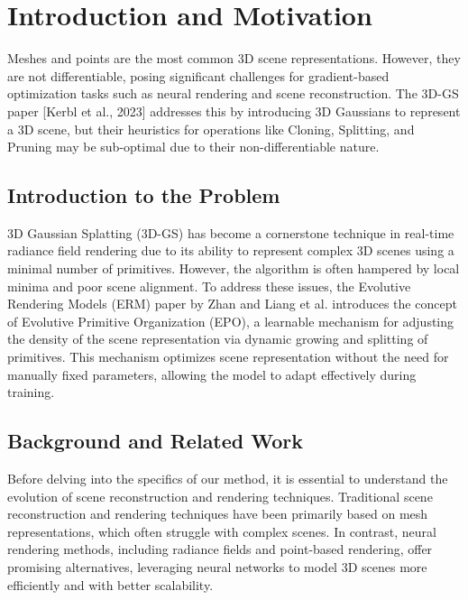 \documentclass[11pt]{report}
\title{\titleinfo}
\author{\authorinfo}
\date{}
\begin{document}
\maketitle
\thispagestyle{empty} %

\tableofcontents
\chapter{Introduction and Motivation}
Meshes and points are the most common 3D scene representations. However, they are not differentiable, posing significant challenges for gradient-based optimization tasks such as neural rendering and scene reconstruction. The 3D-GS paper [Kerbl et al., 2023] addresses this by introducing 3D Gaussians to represent a 3D scene, but their heuristics for operations like Cloning, Splitting, and Pruning may be sub-optimal due to their non-differentiable nature.

\section{Introduction to the Problem}
3D Gaussian Splatting (3D-GS) has become a cornerstone technique in real-time radiance field rendering due to its ability to represent complex 3D scenes using a minimal number of primitives. However, the algorithm is often hampered by local minima and poor scene alignment. To address these issues, the Evolutive Rendering Models (ERM) paper by Zhan and Liang et al. introduces the concept of Evolutive Primitive Organization (EPO), a learnable mechanism for adjusting the density of the scene representation via dynamic growing and splitting of primitives. This mechanism optimizes scene representation without the need for manually fixed parameters, allowing the model to adapt effectively during training.

\section{Background and Related Work}

Before delving into the specifics of our method, it is essential to understand the evolution of scene reconstruction and rendering techniques. Traditional scene reconstruction and rendering techniques have been primarily based on mesh representations, which often struggle with complex scenes. In contrast, neural rendering methods, including radiance fields and point-based rendering, offer promising alternatives, leveraging neural networks to model 3D scenes more efficiently and with better scalability.
\end{document}
